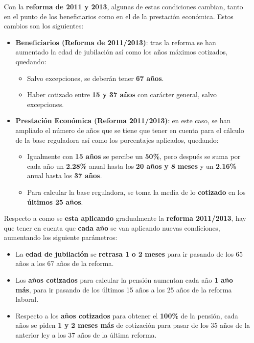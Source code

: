 Con la \textbf{reforma de 2011 y 2013}, algunas de estas condiciones cambian, tanto en el punto de los beneficiarios como en el de la prestación económica. Estos cambios son los siguientes:

\begin{itemize}
    \item \textbf{Beneficiarios (Reforma de 2011/2013)}: tras la reforma se han aumentado la edad de jubilación así como los años máximos cotizados, quedando:

    \begin{itemize}
        \item Salvo excepciones, se deberán tener \textbf{67 años}.
        \item Haber cotizado entre \textbf{15 y 37 años} con carácter general, salvo excepciones.
    \end{itemize}

    \item \textbf{Prestación Económica (Reforma 2011/2013)}: en este caso, se han ampliado el número de años que se tiene que tener en cuenta para el cálculo de la base reguladora así como los porcentajes aplicados, quedando:

    \begin{itemize}
        \item Igualmente con \textbf{15 años} se percibe un \textbf{50\%}, pero después se suma por cada año un \textbf{2.28\%} anual hasta los \textbf{20 años y 8 meses} y un \textbf{2.16\%} anual hasta los \textbf{37 años}.
        \item Para calcular la base reguladora, se toma la media de lo \textbf{cotizado} en los \textbf{últimos 25 años}.
    \end{itemize}
\end{itemize}

Respecto a como se \textbf{esta aplicando} gradualmente la \textbf{reforma 2011/2013}, hay que tener en cuenta que \textbf{cada año }se van aplicando nuevas condiciones, aumentando los siguiente parámetros:

\begin{itemize}
    \item La \textbf{edad de jubilación} se \textbf{retrasa 1 o 2 meses} para ir pasando de los 65 años a los 67 años de la reforma.
    \item Los \textbf{años cotizados} para calcular la pensión aumentan cada año \textbf{1 año más}, para ir pasando de los últimos 15 años a los 25 años de la reforma laboral.
    \item Respecto a los \textbf{años cotizados} para obtener el \textbf{100\%} de la pensión, cada años se piden \textbf{1 y 2 meses más} de cotización para pasar de los 35 años de la anterior ley a los 37 años de la última reforma.
\end{itemize}

